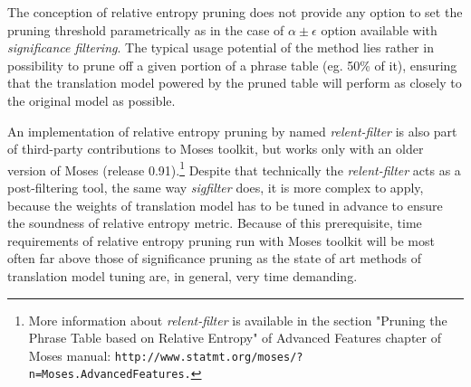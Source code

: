 The conception of relative entropy pruning does not provide any option to set
the pruning threshold parametrically as in the case of $\alpha \pm \epsilon$ option
available with \emph{significance filtering}.
The typical usage potential of the method lies rather in possibility to prune off
a given portion of a phrase table (eg. 50\% of it), ensuring that the translation model
powered by the pruned table will perform as closely to the original model as possible.

An implementation of relative entropy pruning by \citet{ling:relentfilter} named
\emph{relent-filter} is also part of third-party contributions to Moses toolkit,
but works only with an older version of Moses (release 0.91).\footnote{More information
about \emph{relent-filter} is available in the section "Pruning the Phrase Table based
on Relative Entropy" of Advanced Features chapter of Moses manual:
\tt{http://www.statmt.org/moses/?n=Moses.AdvancedFeatures}.}
Despite that technically the \emph{relent-filter} acts as a post-filtering tool,
the same way \emph{sigfilter} does, it is more complex to apply, because the weights
of translation model has to be tuned in advance to ensure the soundness of relative
entropy metric.
Because of this prerequisite, time requirements of relative entropy pruning run with
Moses toolkit will be most often far above those of significance pruning as the state of art
methods of translation model tuning are, in general, very time demanding.

